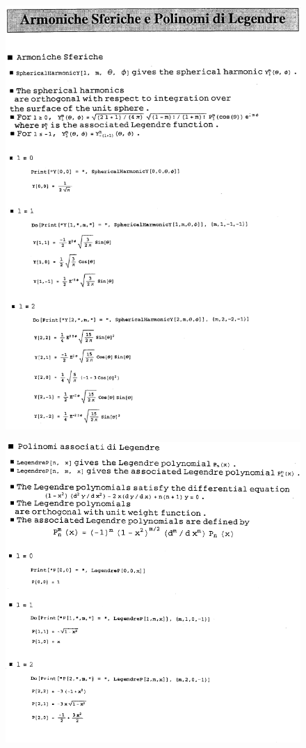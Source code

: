 \newpage
\begin{figure}[!htbp]
\begin{center}
\includegraphics[width=\textwidth]{immagini/cap_17/fig_17_1.png}\\
\end{center}
\end{figure}
\begin{figure}[!htbp]
\begin{center}
\includegraphics[width=\textwidth]{immagini/cap_17/fig_17_2.png}\\
\end{center}
\end{figure}

